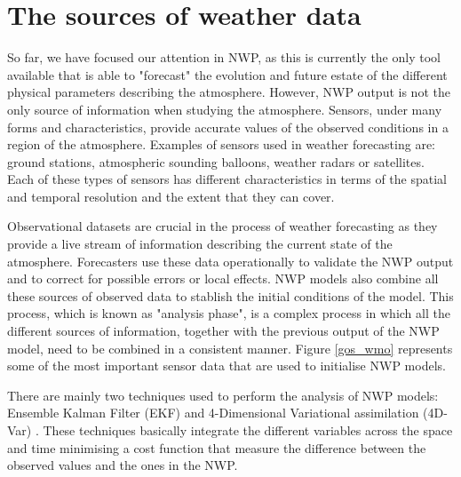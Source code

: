 
\section{The sources of weather data}

So far, we have focused our attention in NWP, as this is currently the only tool available that is able to "forecast" the evolution and future estate of the different physical parameters describing the atmosphere. However, NWP output is not the only source of information when studying the atmosphere. Sensors, under many forms and characteristics, provide accurate values of the observed conditions in a region of the atmosphere. Examples of sensors used in weather forecasting are: ground stations, atmospheric sounding balloons, weather radars or satellites. Each of these types of sensors has different characteristics in terms of the spatial and temporal resolution and the extent that they can cover.

\medskip

Observational datasets are crucial in the process of weather forecasting as they provide a live stream of information describing the current state of the atmosphere. Forecasters use these data operationally to validate the NWP output and to correct for possible errors or local effects. NWP models also combine all these sources of observed data to stablish the initial conditions of the model. This process, which is known as "analysis phase", is a complex process in which all the different sources of information, together with the previous output of the NWP model, need to be combined in a consistent manner. Figure \ref{gos_wmo} represents some of the most important sensor data that are used to initialise NWP models.

\medskip

There are mainly two techniques used to perform the analysis of NWP models: Ensemble Kalman Filter (EKF) \citep{burgers1998analysis} and 4-Dimensional Variational assimilation (4D-Var) \citep{courtier1994strategy}. These techniques basically integrate the different variables across the space and time minimising a cost function that measure the difference between the observed values and the ones in the NWP.

\medskip

